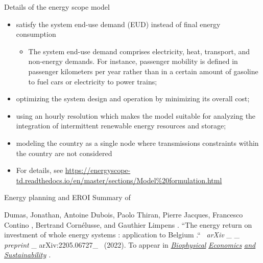 \begin{frame}{Details of the energy scope model}
\label{details-of-the-energy-scope-model}
\begin{itemize}
\tightlist
\item
  satisfy the system end-use demand (EUD) instead of final energy
  consumption

  \begin{itemize}
  \tightlist
  \item
    The system end-use demand comprises electricity, heat, transport,
    and non-energy demands. For instance, passenger mobility is defined
    in passenger kilometers per year rather than in a certain amount of
    gasoline to fuel cars or electricity to power trains;
  \end{itemize}
\item
  optimizing the system design and operation by minimizing its overall
  cost;
\item
  using an hourly resolution which makes the model suitable for
  analyzing the integration of intermittent renewable energy resources
  and storage;
\item
  modeling the country as a single node where transmissions constraints
  within the country are not considered
\item
  For details, see
  \url{https://energyscope-td.readthedocs.io/en/master/sections/Model\%20formulation.html}
\end{itemize}
\end{frame}

\begin{frame}{Energy planning and EROI}
\label{energy-planning-and-eroi-1}
{Summary} { of }

{Dumas, Jonathan, Antoine Dubois, Paolo Thiran, Pierre Jacques,
Francesco } {Contino} {, Bertrand Cornélusse, and Gauthier } {Limpens}
{. ``The } {energy} { return on } {investment} { of } {whole} { }
{energy} { } {systems} {: application to } {Belgium} {.``~} {
\emph{arXiv} } { \_ \_ } { \emph{preprint} } { \_ arXiv:2205.06727\_ }
{~(2022). To } {appear} { in } {
\emph{\href{https://www.springer.com/journal/41247/}{Biophysical}} } {
\emph{\href{https://www.springer.com/journal/41247/}{}} } {
\emph{\href{https://www.springer.com/journal/41247/}{Economics}} } {
\emph{\href{https://www.springer.com/journal/41247/}{and}} } {
\emph{\href{https://www.springer.com/journal/41247/}{Sustainability}} }
{ \emph{.} }
\end{frame}

